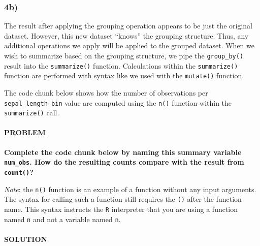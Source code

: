 \documentclass[]{article}
\newenvironment{Shaded}{\begin{snugshade}}{\end{snugshade}}
\newcommand{\DataTypeTok}[1]{\textcolor[rgb]{0.13,0.29,0.53}{#1}}
\newcommand{\KeywordTok}[1]{\textcolor[rgb]{0.13,0.29,0.53}{\textbf{#1}}}
\newcommand{\NormalTok}[1]{#1}
\newcommand{\OperatorTok}[1]{\textcolor[rgb]{0.81,0.36,0.00}{\textbf{#1}}}
\newcommand{\StringTok}[1]{\textcolor[rgb]{0.31,0.60,0.02}{#1}}
\let\oldparagraph\paragraph
\renewcommand{\paragraph}[1]{\oldparagraph{#1}\mbox{}}
\begin{document}
\hypertarget{b-3}{%
\subsubsection{4b)}\label{b-3}}

The result after applying the grouping operation appears to be just the
original dataset. However, this new dataset ``knows'' the grouping
structure. Thus, any additional operations we apply will be applied to
the grouped dataset. When we wish to summarize based on the grouping
structure, we pipe the \texttt{group\_by()} result into the
\texttt{summarize()} function. Calculations within the
\texttt{summarize()} function are performed with syntax like we used
with the \texttt{mutate()} function.

The code chunk below shows how the number of observations per
\texttt{sepal\_length\_bin} value are computed using the \texttt{n()}
function within the \texttt{summarize()} call.

\hypertarget{problem-19}{%
\paragraph{PROBLEM}\label{problem-19}}

\textbf{Complete the code chunk below by naming this summary variable
\texttt{num\_obs}. How do the resulting counts compare with the result
from \texttt{count()}?}

\emph{Note}: the \texttt{n()} function is an example of a function
without any input arguments. The syntax for calling such a function
still requires the \texttt{()} after the function name. This syntax
instructs the \texttt{R} interpreter that you are using a function named
\texttt{n} and not a variable named \texttt{n}.

\hypertarget{solution-18}{%
\paragraph{SOLUTION}\label{solution-18}}

\begin{Shaded}
\end{Shaded}
\end{document}
